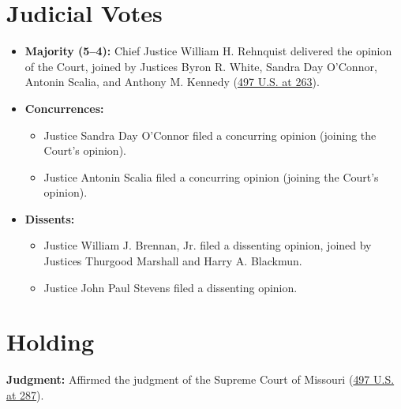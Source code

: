 \documentclass[12pt]{article}
\begin{document}
\section{Judicial Votes}

\begin{itemize}
  \item \textbf{Majority (5--4):} Chief Justice William H. Rehnquist delivered the opinion of the Court, joined by Justices Byron R. White, Sandra Day O'Connor, Antonin Scalia, and Anthony M. Kennedy (\href{https://supreme.justia.com/cases/federal/us/497/261/}{497 U.S. at 263}).
  \item \textbf{Concurrences:}
    \begin{itemize}
      \item Justice Sandra Day O'Connor filed a concurring opinion (joining the Court's opinion).
      \item Justice Antonin Scalia filed a concurring opinion (joining the Court's opinion).
    \end{itemize}
  \item \textbf{Dissents:}
    \begin{itemize}
      \item Justice William J. Brennan, Jr. filed a dissenting opinion, joined by Justices Thurgood Marshall and Harry A. Blackmun.
      \item Justice John Paul Stevens filed a dissenting opinion.
    \end{itemize}
\end{itemize}

\section{Holding}

\textbf{Judgment:} Affirmed the judgment of the Supreme Court of Missouri (\href{https://supreme.justia.com/cases/federal/us/497/261/}{497 U.S. at 287}).
\end{document}
